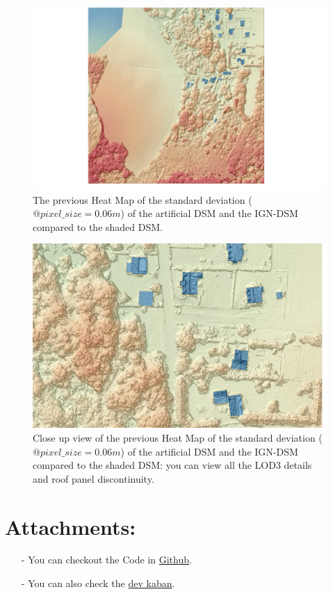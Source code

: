 \documentclass[a4paper, 11pt]{article}
\begin{document}
	\begin{figure}[H]
		\begin{center}
			\caption{\label{img::heatmap_shading_06} The previous Heat Map of the standard deviation ($@ pixel\_size=0.06m$) of the artificial DSM and the IGN-DSM compared to the shaded DSM.}
			\includegraphics[scale=.4]{images/raster/elancourt/shaded_dsm_heat_06.png}
		\end{center}
	\end{figure}
	
	\begin{figure}[H]
		\begin{center}
			\caption{\label{img::close_heatmap_shading_06} Close up view of the previous Heat Map of the standard deviation ($@ pixel\_size=0.06m$) of the artificial DSM and the IGN-DSM compared to the shaded DSM: you can view all the LOD3 details and roof panel discontinuity.}
			\includegraphics[scale=.4]{images/raster/elancourt/closeup_heat_shaded_06.png}
		\end{center}
	\end{figure}
\section*{Attachments:}

\begin{itemize}
	\item[-] You can checkout the Code in \href{https://github.com/Ethiy/3DSceneModel}{Github}.
	\item[-] You can also check the \href{https://github.com/Ethiy/3DSceneModel/projects/1}{dev kaban}.
\end{itemize}
	
\end{document}
